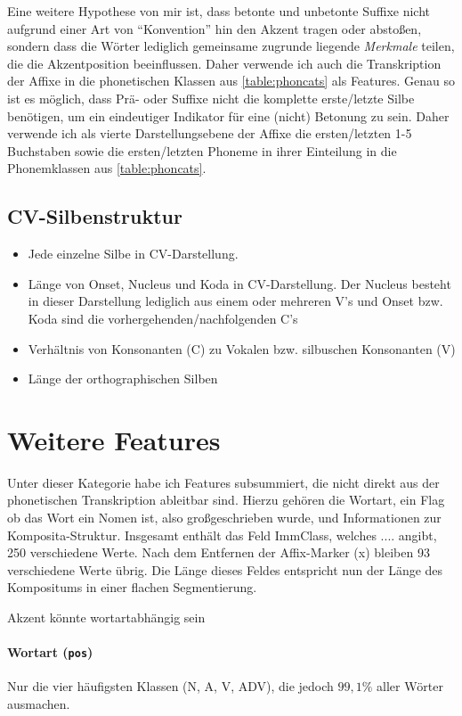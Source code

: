 Eine weitere Hypothese von mir ist, dass betonte und unbetonte Suffixe nicht aufgrund einer Art von \enquote{Konvention} hin den Akzent tragen oder abstoßen, sondern dass die Wörter lediglich gemeinsame zugrunde liegende \textit{Merkmale} teilen, die die Akzentposition beeinflussen. Daher verwende ich auch die Transkription der Affixe in die phonetischen Klassen aus \ref{table:phoncats} als Features.
Genau so ist es möglich, dass Prä- oder Suffixe nicht die komplette erste/letzte Silbe benötigen, um ein eindeutiger Indikator für eine (nicht) Betonung zu sein. Daher verwende ich als vierte Darstellungsebene der Affixe die ersten/letzten 1-5 Buchstaben sowie die ersten/letzten Phoneme in ihrer Einteilung in die Phonemklassen aus \ref{table:phoncats}.

\subsection{CV-Silbenstruktur}
\begin{itemize}
\item Jede einzelne Silbe in CV-Darstellung.
\item Länge von Onset, Nucleus und Koda in CV-Darstellung. Der Nucleus besteht in dieser Darstellung lediglich aus einem oder mehreren V's und Onset bzw. Koda sind die vorhergehenden/nachfolgenden C's
\item Verhältnis von Konsonanten (C) zu Vokalen bzw. silbuschen Konsonanten (V)
\item Länge der orthographischen Silben
\end{itemize}

\section{Weitere Features}
Unter dieser Kategorie habe ich Features subsummiert, die nicht direkt aus der phonetischen Transkription ableitbar sind. Hierzu gehören die Wortart, ein Flag ob das Wort ein Nomen ist, also großgeschrieben wurde, und Informationen zur Komposita-Struktur. Insgesamt enthält das Feld ImmClass, welches .... angibt, 250 verschiedene Werte. Nach dem Entfernen der Affix-Marker (x) bleiben 93 verschiedene Werte übrig. Die Länge dieses Feldes entspricht nun der Länge des Kompositums in einer flachen Segmentierung.

Akzent könnte wortartabhängig sein \cite[S.~37]{Eisenberg1991}

\paragraph*{Wortart (\texttt{pos})}
Nur die vier häufigsten Klassen (N, A, V, ADV), die jedoch $99,1\%$ aller Wörter ausmachen. 


